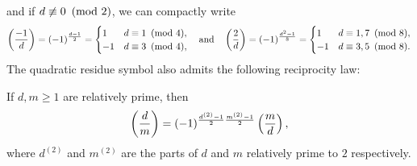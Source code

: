 \documentclass[12pt,reqno,oneside]{amsart}
\begin{document}
    and if $d \not\equiv 0 \ \left(\text{mod }2\right)$, we can compactly write
    \[
        \left(\frac{-1}{d}\right) = (-1)^{\frac{d-1}{2}} = \begin{cases} 1 & \text{$d \equiv 1 \ \left(\text{mod }4\right)$}, \\ -1 & \text{$d \equiv 3 \ \left(\text{mod }4\right)$}, \end{cases} \quad \text{and} \quad \left(\frac{2}{d}\right) = (-1)^{\frac{d^{2}-1}{8}} = \begin{cases} 1 & \text{$d \equiv 1,7 \ \left(\text{mod }8\right)$}, \\ -1 & \text{$d \equiv 3,5 \ \left(\text{mod }8\right)$}. \end{cases}
    \]
     The quadratic residue symbol also admits the following reciprocity law:

    \begin{theorem}
        If $d,m \ge 1$ are relatively prime, then
        \[
            \left(\frac{d}{m}\right) = (-1)^{\frac{d^{(2)}-1}{2}\frac{m^{(2)}-1}{2}}\left(\frac{m}{d}\right),
        \]
        where $d^{(2)}$ and $m^{(2)}$ are the parts of $d$ and $m$ relatively prime to $2$ respectively.
    \end{theorem}
\end{document}

